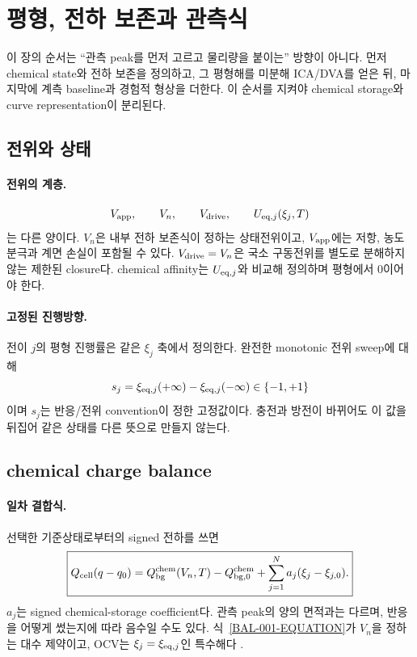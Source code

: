 \section{평형, 전하 보존과 관측식}\label{EQ-CH1}

이 장의 순서는 ``관측 peak를 먼저 고르고 물리량을 붙이는'' 방향이
아니다. 먼저 chemical state와 전하 보존을 정의하고, 그 평형해를
미분해 ICA/DVA를 얻은 뒤, 마지막에 계측 baseline과 경험적 형상을
더한다. 이 순서를 지켜야 chemical storage와 curve representation이
분리된다.

\subsection{전위와 상태}\label{EQ-CH1-STATE}

\paragraph{ 전위의 계층.}
\[
V_{\mathrm{app}},\qquad V_n,\qquad V_{\mathrm{drive}},\qquad
U_{\mathrm{eq},j}(\xi_j,T)
\]
는 다른 양이다. $V_n$은 내부 전하 보존식이 정하는 상태전위이고,
$V_{\mathrm{app}}$에는 저항, 농도분극과 계면 손실이 포함될 수 있다.
$V_{\mathrm{drive}}=V_n$은 국소 구동전위를 별도로 분해하지 않는 제한된
closure다. chemical affinity는 $U_{\mathrm{eq},j}$와 비교해 정의하며
평형에서 0이어야 한다.

\paragraph{ 고정된 진행방향.}
전이 $j$의 평형 진행률은 같은 $\xi_j$ 축에서 정의한다. 완전한
monotonic 전위 sweep에 대해
\[
s_j=\xi_{\mathrm{eq},j}(+\infty)-\xi_{\mathrm{eq},j}(-\infty)\in\{-1,+1\}
\]
이며 $s_j$는 반응/전위 convention이 정한 고정값이다. 충전과 방전이
바뀌어도 이 값을 뒤집어 같은 상태를 다른 뜻으로 만들지 않는다.

\subsection{chemical charge balance}\label{BAL-CH1}

\paragraph{ 일차 결합식.}
선택한 기준상태로부터의 signed 전하를 쓰면
\begin{equation}
\boxed{
Q_{\mathrm{cell}}(q-q_0)
=Q_{\mathrm{bg}}^{\mathrm{chem}}(V_n,T)-Q_{\mathrm{bg},0}^{\mathrm{chem}}
+\sum_{j=1}^{N}a_j(\xi_j-\xi_{j,0}) .
}
\label{BAL-001-EQUATION}
\end{equation}
$a_j$는 signed chemical-storage coefficient다. 관측 peak의 양의
면적과는 다르며, 반응을 어떻게 썼는지에 따라 음수일 수도 있다.
식~\eqref{BAL-001-EQUATION}가 $V_n$을 정하는 대수 제약이고, OCV는
$\xi_j=\xi_{\mathrm{eq},j}$인 특수해다 \cite{doyle,newman}.

